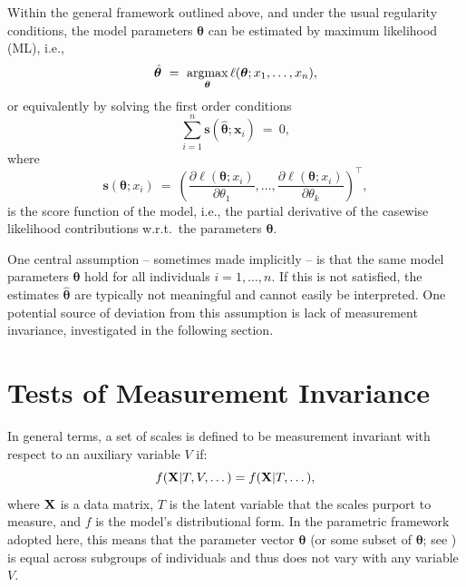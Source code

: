 \documentclass[man]{apa}
\newcommand{\argmax}{\operatorname{argmax}\displaylimits}
\newcommand{\fixme}[1]{\emph{\marginpar{FIXME} (#1)}}
\begin{document}
Within the general framework outlined above, and under the usual
regularity conditions, the model parameters $\bm{\theta}$ can
be estimated by maximum likelihood (ML), i.e.,
\begin{equation} \label{eq:ml}
  \hat{\bm{\theta}} ~=~ \argmax_{\bm{\theta}} \ell(\bm{\theta}; x_1, \dots, x_n),
\end{equation}
or equivalently by solving the first order conditions
\begin{equation}
    \label{eq:ml1}
  \sum_{i=1}^{n} {\bm s}(\hat{\bm{\theta}}; \bm{x}_i) ~=~ 0,    
\end{equation}
where 
\begin{equation}
  \label{eq:score}
  {\bm s}({\bm \theta}; x_i) ~=~ \left(
    \frac{\partial \ell({\bm \theta}; x_i)}{\partial \theta_1},
    \dots,
    \frac{\partial \ell({\bm \theta}; x_i)}{\partial \theta_k}
  \right)^\top,
\end{equation}
is the score function of the model, i.e., the partial derivative of the casewise
likelihood contributions w.r.t.\ the parameters $\bm{\theta}$.


One central assumption -- sometimes made implicitly -- is that
the same model parameters $\bm{\theta}$ hold for all individuals $i = 1, \dots, n$.
If this is not satisfied, the estimates $\hat{\bm{\theta}}$ are typically
not meaningful and cannot easily be interpreted.
One potential source of deviation from this assumption is lack of
measurement invariance, investigated in the following section.



\section{Tests of Measurement Invariance}

In general terms, a set of scales is defined to be measurement
invariant with respect to an auxiliary variable $V$ if:
\begin{equation}
    \label{eq:midef}
      f({\bf X} | T, V, \dots) = f({\bf X} | T, \dots),
\end{equation}
where ${\bf X}$ is a data matrix, $T$ is the latent
variable that the scales purport to measure, and $f$ is the model's
distributional form.  In the parametric framework
adopted here, this means that the parameter vector ${\bm \theta}$ (or
some subset of ${\bm \theta}$; see ) is equal
across subgroups of individuals and thus does not vary
with any variable $V$.
\end{document}
